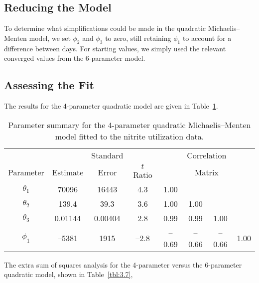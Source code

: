 \subsection{Reducing the Model}

To determine what simplifications could be made in the quadratic
Michaelis--Menten model,
we set $\phi_{2}$ and $\phi_{3}$ to zero,
still retaining $\phi_{1}$
to account for a difference between days.
For starting values, we simply used the relevant converged values
from the 6-parameter model.

\subsection{Assessing the Fit}

The results for the 4-parameter quadratic model are given in
Table~\ref{tbl:3.6}.
\begin{table}
  \caption{
  Parameter summary for the 4-parameter quadratic Michaelis--Menten model
  fitted to the nitrite utilization data.}\label{tbl:3.6}
  \begin{center}
    \begin{tabular}{cccccccc}\hline
      &&\multicolumn{1}{c}{Standard} &&\multicolumn{4}{c}{Correlation}\\
      Parameter & \multicolumn{1}{c}{Estimate}&
      \multicolumn{1}{c}{Error} &\multicolumn{1}{c}{$t$ Ratio} &
      \multicolumn{4}{c}{Matrix}\\ \hline 
      $\theta_{1}$&70096&16443&4.3&1.00\\
      $\theta_{2}$&139.4&39.3&3.6&1.00&1.00\\
      $\theta_{3}$&0.01144&0.00404&2.8&0.99&0.99&1.00\\
      $\phi_{1}$&--5381&1915&--2.8&--\/0.69&--\/0.66&--\/0.66&1.00\\ \hline
    \end{tabular}
  \end{center}
\end{table}
The extra sum of squares analysis for the 4-parameter
versus the 6-parameter quadratic model, shown in
Table~\ref{tbl:3.7},
